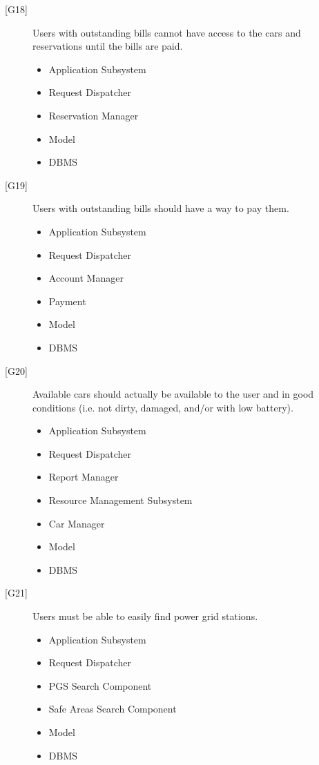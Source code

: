 \documentclass[english]{article}
\begin{document}
\begin{description}
\begin{itemize}
	\end{itemize}
	\item[{[G18]}]{Users with outstanding bills cannot have access to the cars and reservations until the bills are paid.}
	\begin{itemize}
		\item{Application Subsystem}
		\item{Request Dispatcher}
		\item{Reservation Manager}
		\item{Model}
		\item{DBMS}
	\end{itemize}
	\item[{[G19]}]{Users with outstanding bills should have a way to pay them.}
	\begin{itemize}
		\item{Application Subsystem}
		\item{Request Dispatcher}
		\item{Account Manager}
		\item{Payment}
		\item{Model}
		\item{DBMS}
	\end{itemize}
	\item[{[G20]}]{Available cars should actually be available to the user and in good conditions (i.e. not dirty, damaged, and/or with low battery).}
	\begin{itemize}
		\item{Application Subsystem}
		\item{Request Dispatcher}
		\item{Report Manager}
		\item{Resource Management Subsystem}
		\item{Car Manager}
		\item{Model}
		\item{DBMS}
	\end{itemize}
	\item[{[G21]}]{Users must be able to easily find power grid stations.}
	\begin{itemize}
		\item{Application Subsystem}
		\item{Request Dispatcher}
		\item{PGS Search Component}
		\item{Safe Areas Search Component}
		\item{Model}
		\item{DBMS}
	\end{itemize}

\end{description}
\end{document}
